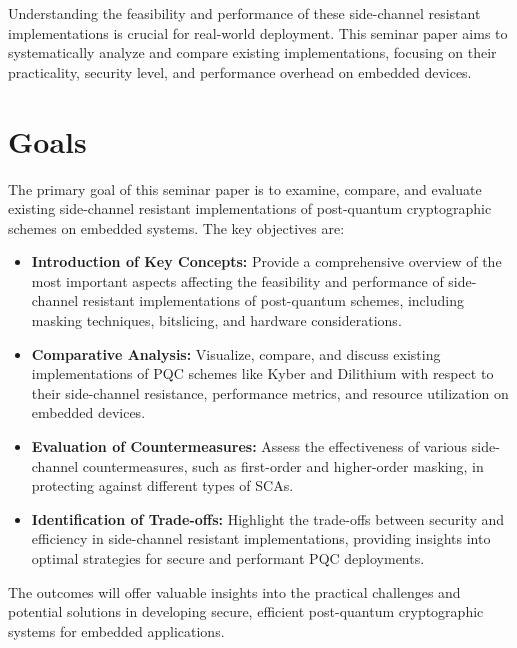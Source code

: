 \documentclass{scrartcl}
\begin{document}
Understanding the feasibility and performance of these side-channel resistant implementations is crucial for real-world deployment. This seminar paper aims to systematically analyze and compare existing implementations, focusing on their practicality, security level, and performance overhead on embedded devices.

\section*{Goals}
The primary goal of this seminar paper is to examine, compare, and evaluate existing side-channel resistant implementations of post-quantum cryptographic schemes on embedded systems. The key objectives are:

\begin{itemize}
	\item \textbf{Introduction of Key Concepts:} Provide a comprehensive overview of the most important aspects affecting the feasibility and performance of side-channel resistant implementations of post-quantum schemes, including masking techniques, bitslicing, and hardware considerations.
	\item \textbf{Comparative Analysis:} Visualize, compare, and discuss existing implementations of PQC schemes like Kyber and Dilithium with respect to their side-channel resistance, performance metrics, and resource utilization on embedded devices.
	\item \textbf{Evaluation of Countermeasures:} Assess the effectiveness of various side-channel countermeasures, such as first-order and higher-order masking, in protecting against different types of SCAs.
	\item \textbf{Identification of Trade-offs:} Highlight the trade-offs between security and efficiency in side-channel resistant implementations, providing insights into optimal strategies for secure and performant PQC deployments.
\end{itemize}

The outcomes will offer valuable insights into the practical challenges and potential solutions in developing secure, efficient post-quantum cryptographic systems for embedded applications.
\end{document}
